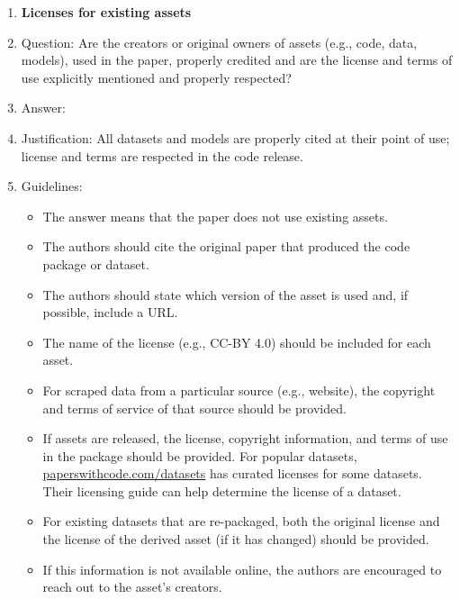 \begin{enumerate}
\item {\bf Licenses for existing assets}
    \item[] Question: Are the creators or original owners of assets (e.g., code, data, models), used in the paper, properly credited and are the license and terms of use explicitly mentioned and properly respected?
    \item[] Answer: \answerYes{}
    \item[] Justification: All datasets and models are properly cited at their point of use; license and terms are respected in the code release.
    \item[] Guidelines:
    \begin{itemize}
        \item The answer \answerNA{} means that the paper does not use existing assets.
        \item The authors should cite the original paper that produced the code package or dataset.
        \item The authors should state which version of the asset is used and, if possible, include a URL.
        \item The name of the license (e.g., CC-BY 4.0) should be included for each asset.
        \item For scraped data from a particular source (e.g., website), the copyright and terms of service of that source should be provided.
        \item If assets are released, the license, copyright information, and terms of use in the package should be provided. For popular datasets, \url{paperswithcode.com/datasets} has curated licenses for some datasets. Their licensing guide can help determine the license of a dataset.
        \item For existing datasets that are re-packaged, both the original license and the license of the derived asset (if it has changed) should be provided.
        \item If this information is not available online, the authors are encouraged to reach out to the asset's creators.
    \end{itemize}


\end{enumerate}

